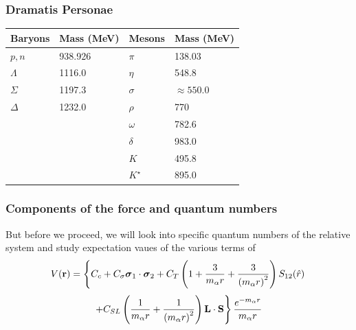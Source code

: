 \documentclass[compress]{beamer}
\begin{document}
\frame
{
  \frametitle{Dramatis Personae}
\begin{center}
\begin{tabular}{llll} \\ \hline
\multicolumn{1}{c}{Baryons}&
\multicolumn{1}{c}{Mass (MeV)}&
\multicolumn{1}{c}{Mesons}&
\multicolumn{1}{c}{Mass (MeV)}
\\ \hline
$p,n$&938.926&$\pi$&138.03\\
$\Lambda$&1116.0&$\eta$&548.8\\
$\Sigma$&1197.3&$\sigma$&$\approx 550.0$\\
$\Delta$&1232.0&$\rho$&770\\
&&$\omega$&782.6\\
&&$\delta$&983.0\\
&&$K$&495.8\\
&&$K^{\star}$&895.0\\  \hline
\end{tabular}
\end{center}
}

\frame
{
\frametitle{Components of the force and quantum numbers}
But before we proceed, we will look into specific quantum numbers of the relative system and study 
expectation vaues of the various terms of
\[
V({\bf r})= \left\{ C_c + C_\sigma 
\mbox{\boldmath $\sigma$}_1\cdot\mbox{\boldmath $\sigma$}_2
 + C_T \left( 1 + {3\over m_\alpha r} + {3\over
\left(m_\alpha r\right)^2}\right) S_{12} (\hat r)\right. 
\]
\[
\left. + C_{SL} \left( {1\over m_\alpha r} + {1\over \left( m_\alpha r\right)^2}
\right) {\bf L}\cdot {\bf S}
\right\} \frac{e^{-m_\alpha r}}{m_\alpha r}
\]
} 
\end{document}

